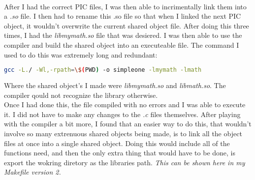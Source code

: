 \documentclass{article}
\begin{document}
\begin {enumerate}
\begin{enumerate}
			\\
			After I had the correct PIC files, I was then able to incrimentally
			link them into a \emph{.so} file. I then had to rename this .so file 
			so that when I linked the next PIC object, it wouldn't overwrite 
			the current shared object file. After doing this three times, I had the
			\emph{libmymath.so} file that was desiered. I was then able to 
			use the compiler and build the shared object into an executeable file. 
			The command I used to do this was extremely long and redundant:
			\begin{lstlisting}[language=bash]
gcc -L./ -Wl,-rpath=\$(PWD) -o simpleone -lmymath -lmath
			\end{lstlisting}
			Where the shared object's I made were \emph{libmymath.so} and
			\emph{libmath.so}. The compiler qould not recognize the library otherwise. 
			\\
			Once I had done this, the file compiled with no errors and I was able to execute it.
			I did not have to make any changes to the \emph{.c} files themselves. 
			After playing with the compiler a bit more, I found that an easier way to do this,
			that wouldn't involve so many extrenuous shared objects being made, is to link all the object files
			at once into a single shared object. Doing this would include all of the functions need, and then the 
			only extra thing that would have to be done, is export the wokring diretory as the libraries path.
			\emph{This can be shown here in my Makefile version 2.}
			
		\end{enumerate}
		
		
\end{enumerate}
\end{document}
